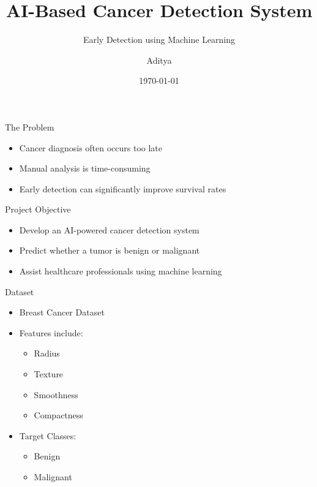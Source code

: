 \documentclass{beamer}
\title{AI-Based Cancer Detection System}
\subtitle{Early Detection using Machine Learning}
\author{Aditya}
\date{\today}
\begin{document}
\frame[c]{\maketitle}


\begin{frame}{The Problem}
\begin{itemize}
\item Cancer diagnosis often occurs too late
\item Manual analysis is time-consuming
\item Early detection can significantly improve survival rates
\end{itemize}
\end{frame}


\begin{frame}{Project Objective}
\begin{itemize}
\item Develop an AI-powered cancer detection system
\item Predict whether a tumor is benign or malignant
\item Assist healthcare professionals using machine learning
\end{itemize}
\end{frame}


\begin{frame}{Dataset}
\begin{itemize}
\item Breast Cancer Dataset
\item Features include:
\begin{itemize}
\item Radius
\item Texture
\item Smoothness
\item Compactness
\end{itemize}
\item Target Classes:
\begin{itemize}
\item Benign
\item Malignant
\end{itemize}
\end{itemize}
\end{frame}
\end{document}
